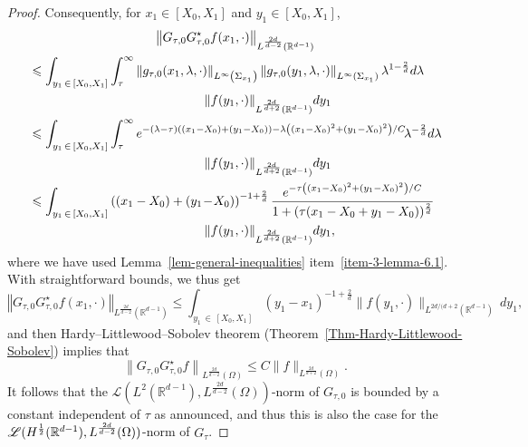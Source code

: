 \documentclass[10pt]{amsart}
\theoremstyle{definition}\newtheorem{defi}[theo]{Definition}\newtheorem{rema}[theo]{Remark}\newtheorem{exam}[theo]{Example}\newtheorem{exem}[theo]{Example}\newtheorem{nota}[theo]{Notation}
\newcommand{\scL}{\mathscr{L}}
\newcommand*\R{\mathbb{R}}
\newcommand{\norm}[1]{\left\Vert#1\right\Vert}
\renewcommand{\leq}{\leqslant}
\begin{document}
\begin{proof}
Consequently, for $x_1 \in [X_0, X_1]$ and $y_1 \in [X_0, X_1]$,
\begin{multline*}
\norm{G_{\tau,0} G_{\tau,0}^\star f(x_1, \cdot)
}_{L^{\frac{2d}{d-2}}\left(\R^{d-1}\right)}
\\
\begin{aligned}
&\leq
\int_{y_1\, \in\,[X_0, X_1]} \int_\tau^\infty \norm{ g_{\tau,0}(x_1,\lambda, \cdot)}_{L^\infty\left(\Sigma_{x_1}\right)} \norm{g_{\tau,0}(y_1,\lambda, \cdot)}_{L^\infty(\Sigma_{x_1})} \lambda^{1 - \frac{2}{d}} d \lambda\\
& \mkern250mu  \| f(y_1, \cdot) \|_{L^{\frac{2d}{d+2}}\left(\R^{d-1}\right)} dy_1
\\
& \leq
\int_{y_1\,\in\,[X_0, X_1]} 
\int_\tau^\infty  e^{-(\lambda - \tau)\left((x_1 - X_0)+(y_1-X_0)\right) - \lambda \left((x_1 - X_0)^2+(y_1-X_0)^2\right)/C}\!\lambda^{ - \frac{2}{d}} d \lambda \\
&\mkern250mu \| f(y_1, \cdot) \|_{L^{\frac{2d}{d+2}}\left(\R^{d-1}\right)}  dy_1
\\
& \leq 
\int_{y_1\, \in\,[X_0, X_1]}\left((x_1 -X_0) + (y_1\! -\!X_0) \right)^{-1+\frac{2}{d}} \frac{e^{-\tau \left((x_1 - X_0)^2+(y_1-X_0)^2\right)/C}}{1 + (\tau (x_1 -X_0 + y_1 -X_0))^{\frac{2}{d}}}\\
&\mkern250mu \| f(y_1, \cdot) \|_{L^{\frac{2d}{d+2}}\left(\R^{d-1}\right)} dy_1,
\end{aligned}
\end{multline*}
where we have used Lemma~\ref{lem-general-inequalities} item~\eqref{item-3-lemma-6.1}. With straightforward bounds, we thus get
\[
\norm{G_{\tau,0} G_{\tau,0}^\star f(x_1, \cdot)
}_{L^{\frac{2d}{d-2}}\left(\R^{d-1}\right)}
\leq
\int_{y_1\, \in\,[X_0, X_1]}\left(y_1 -x_1 \right)^{-1+\frac{2}{d}} \| f(y_1, \cdot) \|_{L^{2d/(d+2}\left(\R^{d-1}\right)} \, dy_1,
\]
and then Hardy--Littlewood--Sobolev theorem (Theorem~\ref{Thm-Hardy-Littlewood-Sobolev}) implies that
\begin{equation*}
\left\| G_{\tau,0} G_{\tau,0}^\star f
\right\|_{L^{\frac{2d}{d-2}}(\Omega)}
\leq C \| f \|_{L^{\frac{2d}{d+2}}(\Omega)}.
\end{equation*}
It follows that the $\scL(L^2(\R^{d-1}), L^{\frac{2d}{d-2}}(\Omega))$-norm of $G_{\tau,0}$ is bounded by a constant independent of $\tau$ as announced, and thus this is also the case for the $\scL(H^{\frac{1}{2}}(\R^{d-1}),\newline L^{\frac{2d}{d-2}}(\Omega))$-norm of $G_\tau$.
\end{proof}
\end{document}
